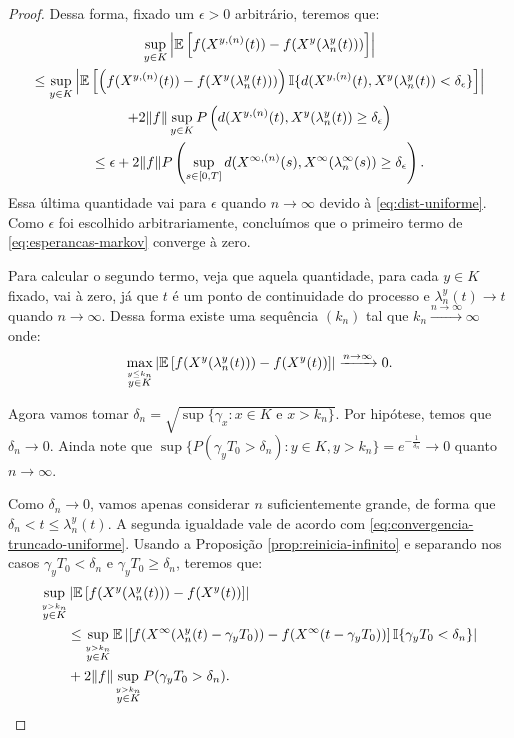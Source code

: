 \begin{proof}
  Dessa forma, fixado um $\epsilon > 0$ arbitrário, teremos que:
  \begin{gather*}
    \sup_{y\in K} \left\lvert {\mathbb{E}} \left[ f(X^{y,(n)}(t)) -
        f(X^{y}(\lambda_n^y(t))) \right]
    \right\rvert\\
    \leq \sup_{y\in K} \left\lvert {\mathbb{E}} \left[ \left(f(X^{y,(n)}(t)) -
          f(X^{y}(\lambda_n^y(t))) \right) {\mathbb{I}}\{ d(X^{y, (n)}(t),
        X^y(\lambda_n^y(t)) < \delta_\epsilon \} \right]
    \right\rvert \\
    + 2\Vert f \Vert \sup_{y \in K} P\left( d(X^{y, (n)}(t),
      X^y(\lambda_n^y(t)) \geq
      \delta_\epsilon \right) \\
    \leq \epsilon + 2 \Vert f \Vert P \left( \sup_{s \in [0,
        T]}d(X^{\infty, (n)}(s), X^\infty(\lambda_n^\infty(s)) \geq
      \delta_\epsilon \right).
  \end{gather*}
  Essa última quantidade vai para $\epsilon$ quando $n\to \infty$
  devido à \eqref{eq:dist-uniforme}. Como $\epsilon$ foi escolhido
  arbitrariamente, concluímos que o primeiro termo de
  \eqref{eq:esperancas-markov} converge à zero.

  Para calcular o segundo termo, veja que aquela quantidade, para cada
  $y \in K$ fixado, vai à zero, já que $t$ é \qc um ponto de
  continuidade do processo e $\lambda_n^y(t) \to t$ quando
  $n\to\infty$. Dessa forma existe uma sequência $(k_n)$ tal que $k_n
  \xrightarrow{n\to\infty} \infty$ onde:
  \begin{displaymath}
      \max_{\stackrel{y \leq k_n}{y\in K}} \left\lvert
      {\mathbb{E}} \left[f(X^y(\lambda_n^y(t))) - f(X^y(t)) \right]
    \right\rvert \xrightarrow{n\to \infty} 0.
  \end{displaymath}

  Agora vamos tomar $\delta_n = \sqrt{\sup\{ \gamma_x: x \in K
    \textrm{ e } x > k_n\}}$. Por hipótese, temos que $\delta_n \to
  0$. Ainda note que $\sup \{ P(\gamma_y T_0 > \delta_n) : y \in K, y
  > k_n \} = e^{-\frac{1}{\delta_n}} \to 0$ quanto $n \to \infty$.

  Como $\delta_n \to 0$, vamos apenas considerar $n$ suficientemente
  grande, de forma que $\delta_n < t \leq \lambda_n^y(t)$. A segunda
  igualdade vale de acordo com
  \eqref{eq:convergencia-truncado-uniforme}. Usando a Proposição
  \ref{prop:reinicia-infinito} e separando nos casos $\gamma_yT_0 <
  \delta_n$ e $\gamma_yT_0 \geq \delta_n$, teremos que:
  \begin{align}
    \label{eq:markov-quase-la}
    \sup_{\stackrel{y > k_n}{y \in K}}& \left\lvert {\mathbb{E}} \left[f(X^y(\lambda_n^y(t))) -
        f(X^y(t)) \right]
    \right\rvert \notag \\
    &\leq \sup_{\stackrel{y > k_n}{y \in K}} {\mathbb{E}} \left\lvert
      \left[f(X^\infty(\lambda_n^y(t)-\gamma_yT_0)) -
        f(X^\infty(t-\gamma_yT_0)) \right] {\mathbb{I}}\{ \gamma_yT_0 <
      \delta_n \}
    \right\rvert\\
    &+ 2 \Vert f \Vert \sup_{\stackrel{y > k_n}{y \in K}} P(\gamma_y T_0 > \delta_n).
    \notag
  \end{align}


\end{proof}
